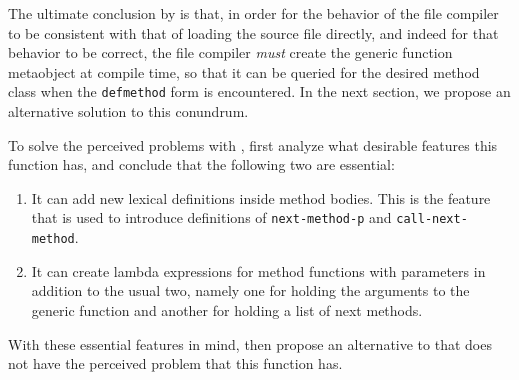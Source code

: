 The ultimate conclusion by \cnh{} is that, in order for
the behavior of the file compiler to be consistent with that of
loading the source file directly, and indeed for that behavior to be
correct, the file compiler \emph{must} create the generic function
metaobject at compile time, so that it can be queried for the desired
method class when the \texttt{defmethod} form is encountered.  In the
next section, we propose an alternative solution to this conundrum.

To solve the perceived problems with \mml{}, \cnh{} first analyze what
desirable features this function has, and conclude that the following
two are essential:

\begin{enumerate}
\item It can add new lexical definitions inside method bodies.  This
  is the feature that is used to introduce definitions of
  \texttt{next-method-p} and \texttt{call-next-method}.
\item It can create lambda expressions for method functions with
  parameters in addition to the usual two, namely one for holding the
  arguments to the generic function and another for holding a list of
  next methods.
\end{enumerate}

With these essential features in mind, \cnh{} then propose an
alternative to \mml{} that does not have the perceived problem that
this function has.

